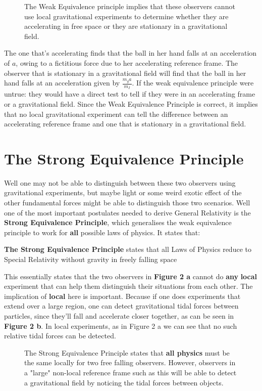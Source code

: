 \documentclass[10pt]{article}
\begin{document}
\begin{figure}[h!]
\centering

\caption{The Weak Equivalence principle implies that these observers cannot use local gravitational experiments to determine whether they are accelerating in free space or they are stationary in a gravitational field.}
\label{fig:my_label}
\end{figure}
   
\pagebreak

The one that's accelerating finds that the ball in her hand falls at an acceleration of $a$, owing to a fictitious force due to her accelerating reference frame. The observer that is stationary in a gravitational field will find that the ball in her hand falls at an acceleration given by $\frac{m_g a}{m_I}$. If the weak equivalence principle were untrue: they would have a direct test to tell if they were in an accelerating frame or a gravitational field. Since the Weak Equivalence Principle is correct, it implies that no local gravitational experiment can tell the difference between an accelerating reference frame and one that is stationary in a gravitational field. 

\section{The Strong Equivalence Principle}
Well one may not be able to distinguish between these two observers using gravitational experiments, but maybe light or some weird exotic effect of the other fundamental forces might be able to distinguish those two scenarios. Well one of the most important postulates needed to derive General Relativity is the \textbf{Strong Equivalence Principle}, which generalises the weak equivalence principle to work for \textbf{all} possible laws of physics. It states that: 
\\

\begin{tcolorbox}
\textbf{The Strong Equivalence Principle} states that all Laws of Physics reduce to Special Relativity without gravity in freely falling space
\end{tcolorbox}

This essentially states that the two observers in \textbf{Figure 2 a} cannot do \textbf{any} \textbf{local} experiment that can help them distinguish their situations from each other. The implication of \textbf{local} here is important. Because if one does experiments that extend over a large region, one can detect gravitational tidal forces between particles, since they'll fall and accelerate closer together, as can be seen in \textbf{Figure 2 b}. In local experiments, as in Figure 2 a we can see that no such relative tidal forces can be detected.
\begin{figure}[h!]
\centering

\caption{The Strong Equivalence Principle states that \textbf{all physics} must be the same locally for two free falling observers. However, observers in a "large" non-local reference frame such as this will be able to detect a gravitational field by noticing the tidal forces between objects.}
\label{fig:my_label}
\end{figure}
\end{document}
